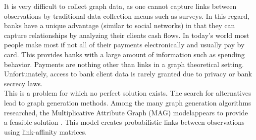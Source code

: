 	It is very difficult to collect graph data, as one cannot capture links
	between observations by traditional data collection means such as surveys. 
	In this regard, banks have a unique advantage (similar to social networks)
	in that they can capture relationships by analyzing their clients cash
	flows. In today's world most people make most if not all of their payments
	electronically and usually pay by card. This provides banks with a large
	amount of information such as spending behavior. Payments are nothing other
	than links in a graph theoretical setting. Unfortunately, access to bank
	client data is rarely granted due to privacy or bank secrecy laws. \\

	\noindent This is a problem for which no perfect solution exists. The
	search for alternatives lead to graph generation methods. Among the many 
	graph generation algorithms researched, the Multiplicative Attribute Graph 
	(MAG) modelappears to provide a feasible solution \citep{kim2012multiplicative}. 
	This model creates probabilistic links between observations using link-affinity
	matrices. 
